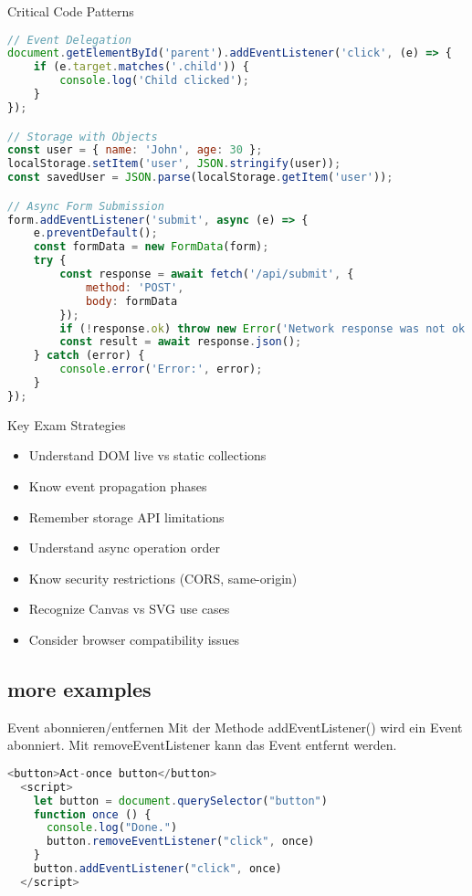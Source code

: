 \begin{examplecode}{Critical Code Patterns}
\begin{lstlisting}[language=JavaScript, style=basesmol]
// Event Delegation
document.getElementById('parent').addEventListener('click', (e) => {
    if (e.target.matches('.child')) {
        console.log('Child clicked');
    }
});

// Storage with Objects
const user = { name: 'John', age: 30 };
localStorage.setItem('user', JSON.stringify(user));
const savedUser = JSON.parse(localStorage.getItem('user'));

// Async Form Submission
form.addEventListener('submit', async (e) => {
    e.preventDefault();
    const formData = new FormData(form);
    try {
        const response = await fetch('/api/submit', {
            method: 'POST',
            body: formData
        });
        if (!response.ok) throw new Error('Network response was not ok');
        const result = await response.json();
    } catch (error) {
        console.error('Error:', error);
    }
});
\end{lstlisting}
\end{examplecode}

\begin{theorem}{Key Exam Strategies}
    \begin{itemize}
        \item Understand DOM live vs static collections
        \item Know event propagation phases
        \item Remember storage API limitations
        \item Understand async operation order
        \item Know security restrictions (CORS, same-origin)
        \item Recognize Canvas vs SVG use cases
        \item Consider browser compatibility issues
    \end{itemize}
\end{theorem}

\subsection{more examples}


\begin{code}{Event abonnieren/entfernen}
    Mit der Methode addEventListener() wird ein Event abonniert. Mit removeEventListener kann das Event entfernt werden.
  \begin{lstlisting}[language=JavaScript, style=basesmol]
  <button>Act-once button</button>
  <script>
    let button = document.querySelector("button")
    function once () {
      console.log("Done.")
      button.removeEventListener("click", once)
    }
    button.addEventListener("click", once)
  </script>
  \end{lstlisting}
  \end{code}

